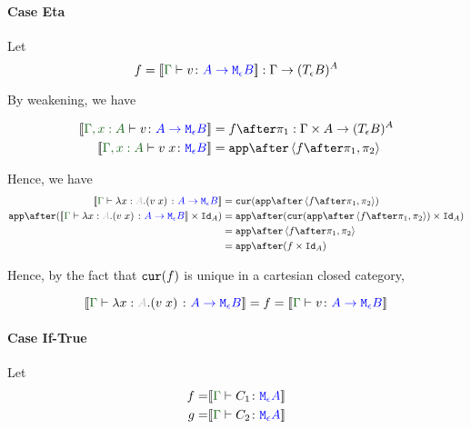 {%

\paragraph{Case Eta}
Let 
\begin{equation}
    f = \deno{\gtyperelation{v}{\aeb}} : \G \rightarrow (\teb)^{A}
\end{equation}

By weakening, we have

\begin{align}
    \deno{\typerelation{\gax}{v}{\aeb}} & = f \after \p : \G \times A \rightarrow (\teb)^A \\
    \deno{\typerelation{\gax}{\apply{v}{x}}{\meb}} & = \app\after\pr{f \after \p}{\pp} \\
\end{align}

Hence, we have 
\begin{equation}
    \begin{split}
        \deno{\gtyperelation{\lam{x}{A}{(\apply{v}{x})}}{\aeb}} & = \cur{\app\after\pr{f \after \p}{\pp}}\\
        \app\after(\deno{\gtyperelation{\lam{x}{A}{(\apply{v}{x})}}{\aeb}} \times \Id{A}) & = \app \after(\cur{\app\after\pr{f \after \p}{\pp}}\times \Id{A})\\
        & = \app \after\pr{f\after\p}{\pp}\\
        & = \app\after(f\times\Id{A})
    \end{split}
\end{equation}

Hence, by the fact that $\texttt{cur}(f)$ is unique in a cartesian closed category, 

\begin{equation}
    \deno{\gtyperelation{\lam{x}{A}{(\apply{v}{x})}}{\aeb}} = f =\deno{\gtyperelation{v}{\aeb}}
\end{equation}

\paragraph{Case If-True}
Let
\begin{align}
    f = &\deno{\gtyperelation{C_1}{\mea}}\\
    g = &\deno{\gtyperelation{C_2}{\mea}}\\
\end{align}

}
